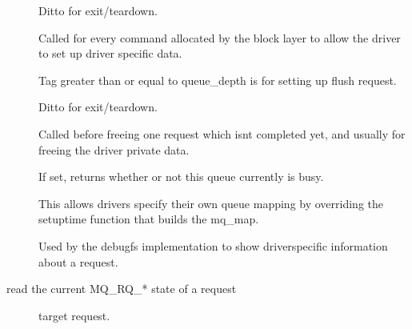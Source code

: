 \documentclass[a4paper,11pt,english]{sphinxmanual}
\begin{document}
\begin{description}
\item[{}] \leavevmode
Ditto for exit/teardown.

\item[{}] \leavevmode
Called for every command allocated by the block layer
to allow the driver to set up driver specific data.

Tag greater than or equal to queue\_depth is for setting up
flush request.

\item[{}] \leavevmode
Ditto for exit/teardown.

\item[{}] \leavevmode
Called before freeing one request which isn\textquotesingle{}t completed
yet, and usually for freeing the driver private data.

\item[{}] \leavevmode
If set, returns whether or not this queue currently is busy.

\item[{}] \leavevmode
This allows drivers specify their own queue mapping by
overriding the setup\sphinxhyphen{}time function that builds the mq\_map.

\item[{}] \leavevmode
Used by the debugfs implementation to show driver\sphinxhyphen{}specific
information about a request.

\end{description}

\begin{fulllineitems}
\label{\detokenize{blk-mq:c.blk_mq_rq_state}}
read the current MQ\_RQ\_* state of a request

\end{fulllineitems}


\begin{description}
\item[{}] \leavevmode
target request.

\end{description}
\end{document}
